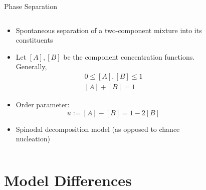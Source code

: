 \documentclass[professionalfont]{beamer}
\theoremstyle{remark}
\begin{document}
\begin{frame}{Phase Separation} %

	\begin{columns}
		\begin{column}{.55\paperwidth}
			
		\begin{itemize}
			\item Spontaneous separation of a two-component mixture into its constituents
			\item Let $[A],[B]$ be the component concentration functions. Generally, 
			\begin{align*}
				0\le [A],[B]\le1\\
				[A]+[B]=1
			\end{align*}
			\item Order parameter:
			\begin{equation*}
				u:=[A]-[B]=1-2[B]
			\end{equation*}
			\item Spinodal decomposition model (as opposed to chance nucleation)
		\end{itemize}

		\end{column}

		\begin{column}{.45\paperwidth}
			

		\begin{figure}
		\end{figure}

		\end{column}

	\end{columns}
\end{frame}

\section{Model Differences}
\end{document}
